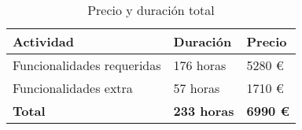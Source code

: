 \begin{table}[!ht]
\begin{center}
\begin{tabular}{|p{80mm}|p{25mm}|p{20mm}|} \hline 
\textbf{Actividad} & \textbf{Duración} & \textbf{Precio} \\ \hline

Funcionalidades requeridas &
176 horas &
5280 \euro{}
\\
\hline

Funcionalidades extra &
57 horas &
1710 \euro{}
\\
\hline \hline

{\bfseries Total} &
{\bfseries 233 horas} &
{\bfseries 6990 \euro{}}
\\
\hline

\end{tabular}
\end{center}
\caption{Precio y duración total}
\label{table:resOthers3}
\end{table}

